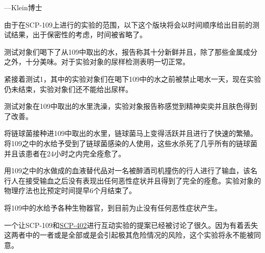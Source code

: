  —Klein博士

由于在SCP-109上进行的实验的范围，以下这个版块将会以时间顺序给出目前的测试结果，出于保密性的考虑，时间被省略了。

\begin{scpbox}

测试对象们喝下了从109中取出的水，报告称其十分新鲜并且，除了那些金属成分之外，十分美味。对于实验对象的尿样检测表明一切正常。

紧接着测试1，其中的实验对象们在喝下109中的水之前被禁止喝水一天，现在实验仍未结束，实验对象们还不能给出尿样。

测试对象在109中取出的水里洗澡，实验对象报告称感觉到精神奕奕并且肤色得到了改善。

将链球菌接种进109中取出的水里，链球菌马上变得活跃并且进行了快速的繁殖。将109之中的水给予受到了链球菌感染的人使用，这些水杀死了几乎所有的链球菌并且该患者在24小时之内完全痊愈了。

用109之中的水做成的血液替代品对一名被醉酒司机撞伤的行人进行了输血，该名行人在接受输血之后没有表现出任何恶性症状并且得到了完全的痊愈。实验对象的物理疗法也比预定时间提早6个月结束了。

将109中的水给予各种生物器官，到目前为止没有任何恶性症状产生。

\end{scpbox}

\begin{scpbox}

一个让SCP-109和\hyperref[chap:SCP-402]{SCP-402}进行互动实验的提案已经被讨论了很久。因为有着丢失这两者中的一者或是全部或是会引起极其危险情况的风险，这个实验将永不能被同意。

\end{scpbox}
